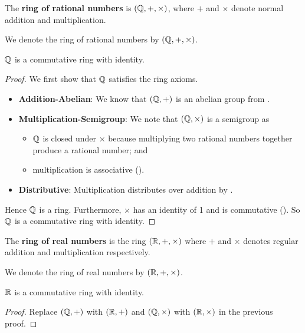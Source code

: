 \begin{definition}
    The \textbf{ring of rational numbers} is $(\mathbb{Q}, +, \times)$, where $+$ and $\times$ denote normal addition and multiplication.
\end{definition}
\begin{remark}
    We denote the ring of rational numbers by $(\mathbb{Q}, +, \times)$.
\end{remark}
\begin{proposition}
    $\mathbb{Q}$ is a commutative ring with identity.
\end{proposition}
\begin{proof}
    We first show that $\mathbb{Q}$ satisfies the ring axioms.
    \begin{itemize}
        \item \textbf{Addition-Abelian}: We know that $(\mathbb{Q}, +)$ is an abelian group from .
        \item \textbf{Multiplication-Semigroup}: We note that $(\mathbb{Q}, \times)$ is a semigroup as
        \begin{itemize}
            \item $\mathbb{Q}$ is closed under $\times$ because multiplying two rational numbers together produce a rational number; and
            \item multiplication is associative ().
        \end{itemize}
        \item \textbf{Distributive}: Multiplication distributes over addition by .
    \end{itemize}
    Hence $\mathbb{Q}$ is a ring. Furthermore, $\times$ has an identity of 1 and is commutative (). So $\mathbb{Q}$ is a commutative ring with identity.
\end{proof}

\begin{definition}
    The \textbf{ring of real numbers} is the ring $(\mathbb{R}, +, \times)$ where $+$ and $\times$ denotes regular addition and multiplication respectively.
\end{definition}
\begin{remark}
    We denote the ring of real numbers by $(\mathbb{R}, +, \times)$.
\end{remark}
\begin{proposition}
    $\mathbb{R}$ is a commutative ring with identity.
\end{proposition}
\begin{proof}
    Replace $(\mathbb{Q}, +)$ with $(\mathbb{R}, +)$ and $(\mathbb{Q}, \times)$ with $(\mathbb{R}, \times)$ in the previous proof.
\end{proof}

